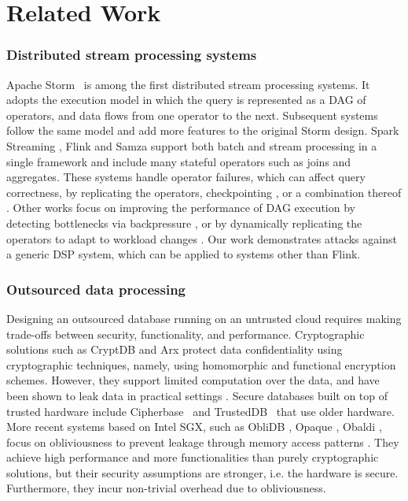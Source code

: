 \section{Related Work}
\label{sec:related}
\subsubsection*{Distributed stream processing systems}
Apache Storm~\cite{toshniwal2014storm} is among the first distributed stream processing systems. It adopts the execution model in 
which the query is represented as a DAG of operators, and data flows from one operator to the next. Subsequent systems 
follow the same model and add more features to the original Storm design. Spark Streaming \cite{zaharia2013discretized}, 
Flink \cite{carbone2015apache} and Samza \cite{noghabi2017samza} support both batch and stream processing in a single framework and include
many stateful operators such as joins and aggregates. These systems handle operator failures, which can affect query 
correctness, by replicating the operators, checkpointing \cite{murray2013naiad}, or a combination thereof \cite{lin2016streamscope}. Other works focus on improving the performance of DAG 
execution by detecting bottlenecks via backpressure \cite{kulkarni2015twitter}, or by dynamically replicating the
operators to adapt to workload changes \cite{castro2013integrating,wu2015chronostream}. Our work demonstrates attacks 
against a generic DSP system, which can be applied to systems other than Flink.  

\subsubsection*{Outsourced data processing}
Designing an outsourced database running on an untrusted cloud requires making trade-offs between security, 
functionality, and performance. Cryptographic solutions such as CryptDB \cite{popa2011cryptdb} and 
Arx \cite{poddar2016arx} protect data confidentiality using cryptographic techniques, namely, using homomorphic and
functional encryption schemes. However, they support limited computation over the data, and have been shown to leak data 
in practical settings \cite{naveed2015inference}. Secure databases built on top of trusted hardware include 
Cipherbase~\cite{arasu2013orthogonal} and TrustedDB~\cite{bajaj2011trusteddb} that use older hardware.                      
More recent systems based on Intel SGX, such as ObliDB \cite{oblidb}, Opaque \cite{zheng2017opaque}, Obaldi \cite{crooks2018obladi}, focus on obliviousness to prevent leakage through memory access patterns \cite{priebe2018enclavedb}. They achieve high performance and more functionalities than purely cryptographic solutions, but their security assumptions are stronger, i.e. the hardware is secure. Furthermore, they incur non-trivial
overhead due to obliviousness.


